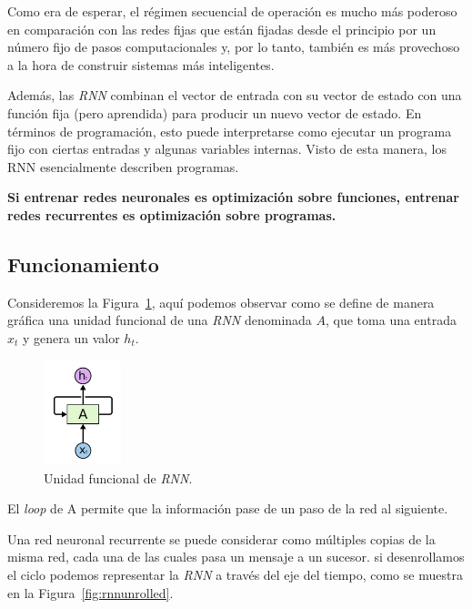 \documentclass[a4paper,12pt]{article}
\begin{document}
Como era de esperar, el régimen secuencial de operación es mucho más poderoso en comparación con las redes fijas que están fijadas desde el principio por un número fijo de pasos computacionales y, por lo tanto, también es más provechoso a la hora de construir sistemas más inteligentes. 

Además, las \textit{RNN} combinan el vector de entrada con su vector de estado con una función fija (pero aprendida) para producir un nuevo vector de estado. En términos de programación, esto puede interpretarse como ejecutar un programa fijo con ciertas entradas y algunas variables internas. Visto de esta manera, los RNN esencialmente describen programas.

\textbf{Si entrenar redes neuronales es optimización sobre funciones, entrenar redes recurrentes es optimización sobre programas.}

\clearpage

\subsection{Funcionamiento}

Consideremos la Figura~\ref{fig:rnnunit}, aquí podemos observar como se define de manera gráfica una unidad funcional de una \textit{RNN} denominada $A$, que toma una entrada $x_t$ y genera un valor $h_t$.

\begin{figure}[H]
	\begin{center}				
		\includegraphics[width=0.2\textwidth]{tesis_27.png}
		\caption{Unidad funcional de \textit{RNN}. \citep{olahlstm}}
		\label{fig:rnnunit}
	\end{center}
\end{figure}

El \textit{loop} de A permite que la información pase de un paso de la red al siguiente.

Una red neuronal recurrente se puede considerar como múltiples copias de la misma red, cada una de las cuales pasa un mensaje a un sucesor. si desenrollamos el ciclo podemos representar la \textit{RNN} a través del eje del tiempo, como se muestra en la  Figura~\ref{fig:rnnunrolled}.
\end{document}
